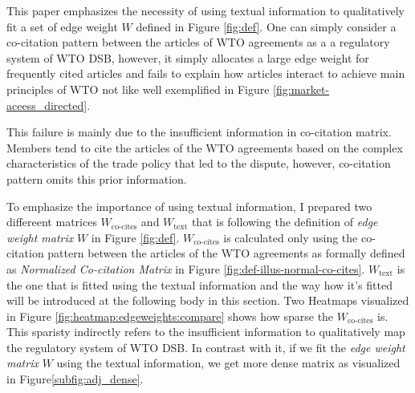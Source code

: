 This paper emphasizes the necessity of using textual information 
to qualitatively fit a set of edge weight $W$ defined in Figure \ref{fig:def}. %
One can simply consider a co-citation pattern between the articles of WTO agreements as a a regulatory system of WTO DSB, however,
it simply allocates a large edge weight for frequently cited articles and fails to explain how articles interact to achieve main principles of WTO not like well exemplified in Figure \ref{fig:market-aceess_directed}.

This failure is mainly due to the insufficient information in co-citation matrix. Members tend to cite the articles of 
the WTO agreements based on the complex characteristics of 
the trade policy that led to the dispute, however, co-citation pattern omits this prior information.

To emphasize the importance of using textual information, I prepared two differeent matrices $W_{\text{co-cites}}$ and $W_{\text{text}}$ that is following the definition of \textit{edge weight matrix} $W$ in Figure \ref{fig:def}.
$W_{\text{co-cites}}$ is calculated only using the co-citation pattern between the articles of the WTO agreements as formally defined as \textit{Normalized Co-citation Matrix} in Figure \ref{fig:def-illus-normal-co-cites}. 
$W_{\text{text}}$ is the one that is fitted using the textual information and the way how it's fitted will be introduced at the following body in this section.
Two Heatmaps visualized in Figure \ref{fig:heatmap:edgeweights:compare} shows how sparse the $W_{\text{co-cites}}$ is. This sparisty indirectly refers to the insufficient information
to qualitatively map the regulatory system of WTO DSB. In contrast with it, if we fit the \textit{edge weight matrix} $W$ using the textual information, we get more dense matrix as visualized in Figure\ref{subfig:adj_dense}.






